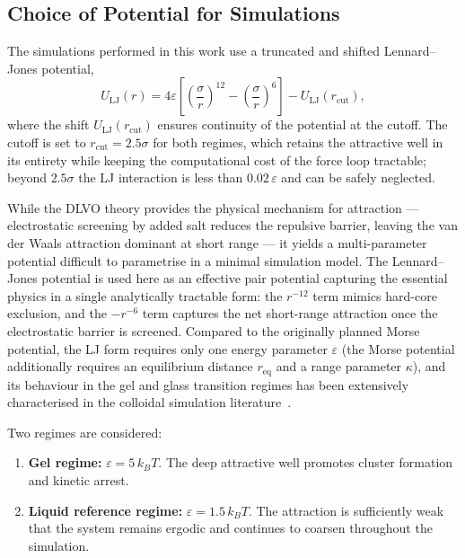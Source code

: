 \documentclass[11pt,a4paper]{article}
\begin{document}
\subsection{Choice of Potential for Simulations}

The simulations performed in this work use a truncated and shifted Lennard--Jones potential,
\begin{equation}
    U_{\mathrm{LJ}}(r)
    =
    4\varepsilon
    \left[
    \left(\frac{\sigma}{r}\right)^{12}
    -
    \left(\frac{\sigma}{r}\right)^6
    \right]
    -
    U_{\mathrm{LJ}}(r_{\mathrm{cut}}),
    \label{eq:lj}
\end{equation}
where the shift $U_{\mathrm{LJ}}(r_{\mathrm{cut}})$ ensures continuity of the potential at the cutoff. The cutoff is set to $r_{\mathrm{cut}} = 2.5\sigma$ for both regimes, which retains the attractive well in its entirety while keeping the computational cost of the force loop tractable; beyond $2.5\sigma$ the LJ interaction is less than $0.02\,\varepsilon$ and can be safely neglected.

While the DLVO theory provides the physical mechanism for attraction — electrostatic screening by added salt reduces the repulsive barrier, leaving the van der Waals attraction dominant at short range — it yields a multi-parameter potential difficult to parametrise in a minimal simulation model. The Lennard--Jones potential is used here as an effective pair potential capturing the essential physics in a single analytically tractable form: the $r^{-12}$ term mimics hard-core exclusion, and the $-r^{-6}$ term captures the net short-range attraction once the electrostatic barrier is screened. Compared to the originally planned Morse potential, the LJ form requires only one energy parameter $\varepsilon$ (the Morse potential additionally requires an equilibrium distance $r_{\mathrm{eq}}$ and a range parameter $\kappa$), and its behaviour in the gel and glass transition regimes has been extensively characterised in the colloidal simulation literature~\cite{foffi}.

Two regimes are considered:
\begin{enumerate}
    \item \textbf{Gel regime:} $\varepsilon = 5\,k_B T$. The deep attractive well promotes cluster formation and kinetic arrest.
    \item \textbf{Liquid reference regime:} $\varepsilon = 1.5\,k_B T$. The attraction is sufficiently weak that the system remains ergodic and continues to coarsen throughout the simulation.
\end{enumerate}
\end{document}
